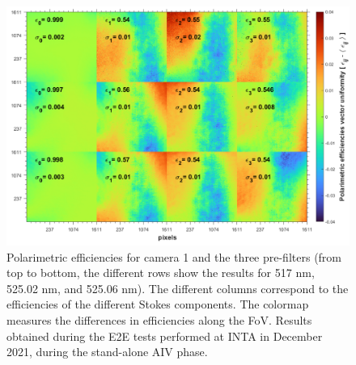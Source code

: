 \begin{figure}
    \includegraphics[width=\textwidth]{figures/TuMag/Pol_efficiencies_map.png}
    \caption{Polarimetric efficiencies for camera 1 and the three pre-filters (from top to bottom, the different rows show the results for 517 nm, 525.02 nm, and 525.06 nm). The different columns correspond to the efficiencies of the different Stokes components. The colormap measures the differences in efficiencies along the FoV. Results obtained during the E2E tests performed at INTA in December 2021, during the stand-alone AIV phase. 
    \label{fig_tumag:pol eff maps}}
\end{figure}

